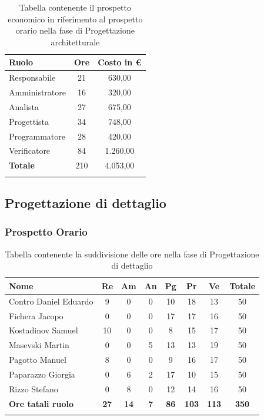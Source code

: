 \documentclass[../piano_di_progetto.tex]{subfiles}
\begin{document}
\begin{center}
	\begin{longtable}{|l|c|c|}
		\hline
		\rowcolor{lightgray}
		\textbf{Ruolo} & \textbf{Ore} & \textbf{Costo in €}\\

		\hline
		Responsabile & 21 & 630,00\\
		Amministratore & 16 & 320,00\\
		Analista & 27 & 675,00\\
		Progettista & 34 & 748,00\\
		Programmatore & 28 & 420,00\\
		Verificatore & 84 & 1.260,00\\
		\hline
		\textbf{Totale} & 210 & 4.053,00\\
		\hline
		\rowcolor{white}
		\caption{Tabella contenente il prospetto economico in riferimento al prospetto orario nella fase di Progettazione architetturale}
	\end{longtable}
\end{center}


\subsection{Progettazione di dettaglio}%
\label{sub:fase_prog_dett}
\subsubsection{Prospetto Orario}

\begin{center}
	\begin{longtable}{|l|c|c|c|c|c|c|c|}
		\hline
		\rowcolor{lightgray}
		\textbf{Nome} & \textbf{Re} & \textbf{Am} & \textbf{An} & \textbf{Pg}  & \textbf{Pr}   & \textbf{Ve} & \textbf{Totale} \\

		\hline
			Contro Daniel Eduardo & 9 & 0 & 0 & 10 & 18 & 13 & 50 \\
			Fichera Jacopo & 0 & 0 & 0 & 17 & 17 & 16 & 50 \\
			Kostadinov Samuel & 10 & 0 & 0 & 8 & 15 & 17 & 50 \\			
			Masevski Martin & 0 & 0 & 5 & 13 & 13 & 19 & 50 \\
			Pagotto Manuel & 8 & 0 & 0 & 9 & 16 & 17 & 50 \\		
			Paparazzo Giorgia & 0 & 6 & 2 & 17 & 10 & 15 & 50 \\
			Rizzo Stefano & 0 & 8 & 0 & 12 & 14 & 16 & 50 \\
			\hline
			\textbf{Ore tatali ruolo} & \textbf{27} & \textbf{14} & \textbf{7} & \textbf{86} & \textbf{103} & \textbf{113} & \textbf{350} \\
		\hline	
		\rowcolor{white}
		\caption{Tabella contenente la suddivisione delle ore nella fase di Progettazione di dettaglio}
	\end{longtable}
\end{center}
\end{document}
